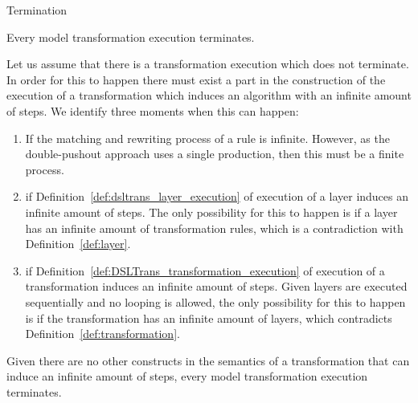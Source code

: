 \begin{proposition}{Termination}

Every model transformation execution terminates.
\end{proposition}
\begin{pf}
Let us assume that there is a transformation execution which does not terminate. In order for this to happen there must exist a part in the construction of the execution of a transformation which induces an algorithm with an infinite amount of steps. We identify three moments when this can happen:
\begin{enumerate}

\item If the matching and rewriting process of a rule is infinite. However, as the double-pushout approach uses a single production, then this must be a finite process. 



\item if Definition~\ref{def:dsltrans_layer_execution} of execution of a layer induces an infinite amount of steps. The only possibility for this to happen is if a layer has an infinite amount of transformation rules, which is a contradiction with Definition~\ref{def:layer}.

\item if Definition~\ref{def:DSLTrans_transformation_execution} of execution of a transformation induces an infinite amount of steps. Given layers are executed sequentially and no looping is allowed, the only possibility for this to happen is if the transformation has an infinite amount of layers, which contradicts Definition~\ref{def:transformation}.


\end{enumerate}
Given there are no other constructs in the semantics of a transformation that can induce an infinite amount of steps, every model transformation execution terminates.
\end{pf}